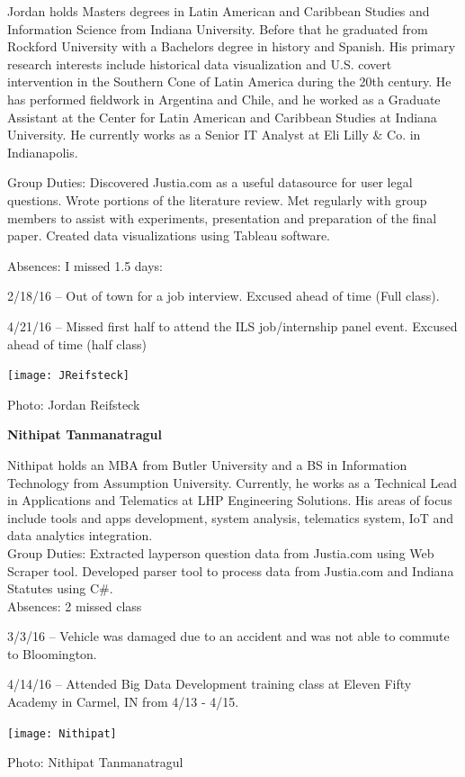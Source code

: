 \documentclass[11pt]{article}
\begin{document}
Jordan holds Masters degrees in Latin American and Caribbean Studies and Information Science from Indiana University. Before that he graduated from Rockford University with a Bachelors degree in history and Spanish. His primary research interests include historical data visualization and U.S. covert intervention in the Southern Cone of Latin America during the 20th century. He has performed fieldwork in Argentina and Chile, and he worked as a Graduate Assistant at the Center for Latin American and Caribbean Studies at Indiana University. He currently works as a Senior IT Analyst at Eli Lilly \& Co. in Indianapolis.  

Group Duties:  Discovered Justia.com as a useful datasource for user legal questions.  Wrote portions of the literature review.  Met regularly with group members to assist with experiments, presentation and preparation of the final paper.  Created data visualizations using Tableau software.

Absences:  I missed 1.5 days:

2/18/16 -- Out of town for a job interview. Excused ahead of time (Full class).

4/21/16 -- Missed first half to attend the ILS job/internship panel event. Excused ahead of time (half class)

\vspace{5mm}
\texttt{[image: JReifsteck]}

Photo: Jordan Reifsteck

\vspace{10mm}
\noindent \textbf{Nithipat Tanmanatragul}

Nithipat holds an MBA from Butler University and a BS in Information Technology from Assumption University. Currently, he works as a Technical Lead in Applications and Telematics at LHP Engineering Solutions. His areas of focus include tools and apps development, system analysis, telematics system, IoT and data analytics integration.\\

Group Duties: Extracted layperson question data from Justia.com using Web Scraper tool. Developed parser tool to process data from Justia.com and Indiana Statutes using C\#. \\

Absences: 2 missed class

3/3/16 -- Vehicle was damaged due to an accident and was not able to commute to Bloomington.

4/14/16 -- Attended Big Data Development training class at Eleven Fifty Academy in Carmel, IN from 4/13 - 4/15.

\vspace{5mm}
\texttt{[image: Nithipat]}

Photo: Nithipat Tanmanatragul
\vspace{10mm}
\end{document}
